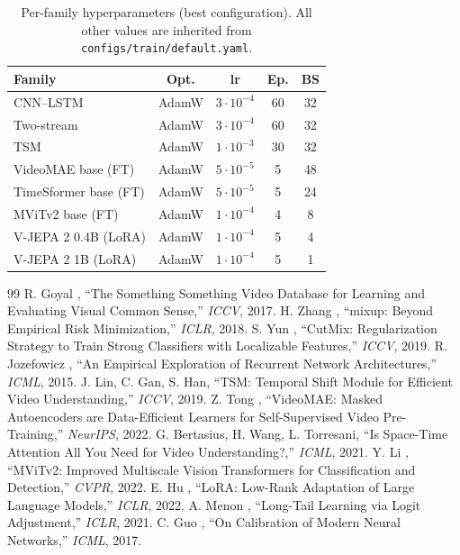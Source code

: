 \documentclass[10pt,twocolumn,letterpaper]{article}
\begin{document}
\begin{table}[h]
\centering
\small
\begin{tabular}{lcccc}
\toprule
\textbf{Family} & \textbf{Opt.} & \textbf{lr} & \textbf{Ep.} & \textbf{BS} \\
\midrule
CNN--LSTM              & AdamW & $3\!\cdot\!10^{-4}$ & 60 & 32 \\
Two-stream             & AdamW & $3\!\cdot\!10^{-4}$ & 60 & 32 \\
TSM                    & AdamW & $1\!\cdot\!10^{-3}$ & 30 & 32 \\
VideoMAE base (FT)     & AdamW & $5\!\cdot\!10^{-5}$ &  5 & 48 \\
TimeSformer base (FT)  & AdamW & $5\!\cdot\!10^{-5}$ &  5 & 24 \\
MViTv2 base (FT)       & AdamW & $1\!\cdot\!10^{-4}$ &  4 &  8 \\
V-JEPA 2 0.4B (LoRA)   & AdamW & $1\!\cdot\!10^{-4}$ &  5 &  4 \\
V-JEPA 2 1B (LoRA)     & AdamW & $1\!\cdot\!10^{-4}$ &  5 &  1 \\
\bottomrule
\end{tabular}
\caption{Per-family hyperparameters (best configuration). All other
values are inherited from \texttt{configs/train/default.yaml}.}
\label{tab:hparams}
\end{table}

{\small

\begin{thebibliography}{99}
 R. Goyal \etal, ``The Something Something Video Database for Learning and Evaluating Visual Common Sense,'' \emph{ICCV}, 2017.
 H. Zhang \etal, ``mixup: Beyond Empirical Risk Minimization,'' \emph{ICLR}, 2018.
 S. Yun \etal, ``CutMix: Regularization Strategy to Train Strong Classifiers with Localizable Features,'' \emph{ICCV}, 2019.
 R. Jozefowicz \etal, ``An Empirical Exploration of Recurrent Network Architectures,'' \emph{ICML}, 2015.
 J. Lin, C. Gan, S. Han, ``TSM: Temporal Shift Module for Efficient Video Understanding,'' \emph{ICCV}, 2019.
 Z. Tong \etal, ``VideoMAE: Masked Autoencoders are Data-Efficient Learners for Self-Supervised Video Pre-Training,'' \emph{NeurIPS}, 2022.
 G. Bertasius, H. Wang, L. Torresani, ``Is Space-Time Attention All You Need for Video Understanding?,'' \emph{ICML}, 2021.
 Y. Li \etal, ``MViTv2: Improved Multiscale Vision Transformers for Classification and Detection,'' \emph{CVPR}, 2022.
 E. Hu \etal, ``LoRA: Low-Rank Adaptation of Large Language Models,'' \emph{ICLR}, 2022.
 A. Menon \etal, ``Long-Tail Learning via Logit Adjustment,'' \emph{ICLR}, 2021.
 C. Guo \etal, ``On Calibration of Modern Neural Networks,'' \emph{ICML}, 2017.
\end{thebibliography}
}
\end{document}
